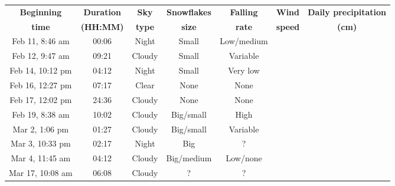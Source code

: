 \begin{table}[htbp]
    \centering
    \begin{tabular}{|c|c|c|c|c|c|c|}
        \hline
        \textbf{Beginning} & \textbf{Duration} & \textbf{Sky}  & \textbf{Snowflakes} & \textbf{Falling} & \textbf{Wind}  & \textbf{Daily precipitation} \\
        \textbf{time}      & \textbf{(HH:MM)}  & \textbf{type} & \textbf{size}       & \textbf{rate}    & \textbf{speed} & \textbf{(cm)}                \\\hline
        Feb 11, 8:46 am    &  00:06            & Night         & Small               & Low/medium       &                &                              \\\hline
        Feb 12, 9:47 am    &  09:21            & Cloudy        & Small               & Variable         &                &                              \\\hline
        Feb 14, 10:12 pm   &  04:12            & Night         & Small               & Very low         &                &                              \\\hline
        Feb 16, 12:27 pm   &  07:17            & Clear         & None                & None             &                &                              \\\hline
        Feb 17, 12:02 pm   &  24:36            & Cloudy        & None                & None             &                &                              \\\hline
        Feb 19, 8:38 am    &  10:02            & Cloudy        & Big/small           & High             &                &                              \\\hline
        Mar 2, 1:06 pm     &  01:27            & Cloudy        & Big/small           & Variable         &                &                              \\\hline
        Mar 3, 10:33 pm    &  02:17            & Night         & Big                 & ?                &                &                              \\\hline
        Mar 4, 11:45 am    &  04:12            & Cloudy        & Big/medium          & Low/none         &                &                              \\\hline
        Mar 17, 10:08 am   &  06:08            & Cloudy        & ?                   & ?                &                &                              \\\hline

\end{tabular}
\end{table}
